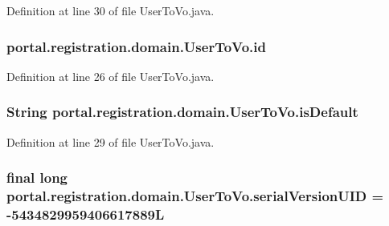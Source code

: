 Definition at line 30 of file UserToVo.java.

\hypertarget{classportal_1_1registration_1_1domain_1_1UserToVo_a246bd26e853d70c296f69df06aacea00}{
\subsubsection[{id}]{ {\bf portal.registration.domain.UserToVo.id}}}
\label{classportal_1_1registration_1_1domain_1_1UserToVo_a246bd26e853d70c296f69df06aacea00}


Definition at line 26 of file UserToVo.java.

\hypertarget{classportal_1_1registration_1_1domain_1_1UserToVo_a27cc1b5973f31bc34b6710a0c33243d2}{
\subsubsection[{isDefault}]{\setlength{\rightskip}{0pt plus 5cm}String {\bf portal.registration.domain.UserToVo.isDefault}}}
\label{classportal_1_1registration_1_1domain_1_1UserToVo_a27cc1b5973f31bc34b6710a0c33243d2}


Definition at line 29 of file UserToVo.java.

\hypertarget{classportal_1_1registration_1_1domain_1_1UserToVo_a35d5b34b5032388d5ce601ff51b0d6b2}{
\subsubsection[{serialVersionUID}]{\setlength{\rightskip}{0pt plus 5cm}final long {\bf portal.registration.domain.UserToVo.serialVersionUID} = -\/5434829959406617889L}}
\label{classportal_1_1registration_1_1domain_1_1UserToVo_a35d5b34b5032388d5ce601ff51b0d6b2}


